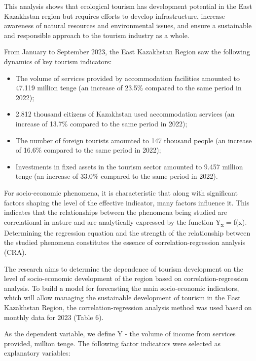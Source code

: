 This analysis shows that ecological tourism has development potential in
the East Kazakhstan region but requires efforts to develop
infrastructure, increase awareness of natural resources and
environmental issues, and ensure a sustainable and responsible approach
to the tourism industry as a whole.

From January to September 2023, the East Kazakhstan Region saw the
following dynamics of key tourism indicators:

\begin{itemize}
\item
  The volume of services provided by accommodation facilities amounted
  to 47.119 million tenge (an increase of 23.5\% compared to the same
  period in 2022);
\item
  2.812 thousand citizens of Kazakhstan used accommodation services (an
  increase of 13.7\% compared to the same period in 2022);
\item
  The number of foreign tourists amounted to 147 thousand people (an
  increase of 16.6\% compared to the same period in 2022);
\item
  Investments in fixed assets in the tourism sector amounted to 9.457
  million tenge (an increase of 33.0\% compared to the same period in
  2022).
\end{itemize}

For socio-economic phenomena, it is characteristic that along with
significant factors shaping the level of the effective indicator, many
factors influence it. This indicates that the relationships between the
phenomena being studied are correlational in nature and are analytically
expressed by the function Y\textsubscript{x} = f(x). Determining the
regression equation and the strength of the relationship between the
studied phenomena constitutes the essence of correlation-regression
analysis (CRA).

The research aims to determine the dependence of tourism development on
the level of socio-economic development of the region based on
correlation-regression analysis. To build a model for forecasting the
main socio-economic indicators, which will allow managing the
sustainable development of tourism in the East Kazakhstan Region, the
correlation-regression analysis method was used based on monthly data
for 2023 (Table 6).

As the dependent variable, we define Y - the volume of income from
services provided, million tenge. The following factor indicators were
selected as explanatory variables:

